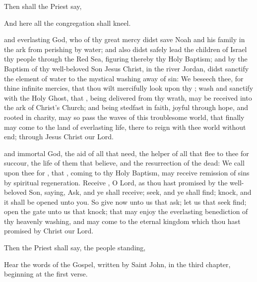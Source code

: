 \newpage

\begin{rubric}
Then shall the Priest say,
\end{rubric}


\begin{rubric}
And here all the congregation shall kneel.
\end{rubric}

 and everlasting God, who of thy great mercy didst save Noah and his family in the ark from perishing by water; and also didst safely lead the children of Israel thy people through the Red Sea, figuring thereby thy Holy Baptism; and by the Baptism of thy well-beloved Son Jesus Christ, in the river Jordan, didst sanctify the element of water to the mystical washing away of sin: We beseech thee, for thine infinite mercies, that thou wilt mercifully look upon  thy ; wash  and sanctify  with the Holy Ghost, that , being delivered from thy wrath, may be received into the ark of Christ's Church; and being stedfast in faith, joyful through hope, and rooted in charity, may so pass the waves of this troublesome world, that finally  may come to the land of everlasting life, there to reign with thee world without end; through Jesus Christ our Lord.

 and immortal God, the aid of all that need, the helper of all that flee to thee for succour, the life of them that believe, and the resurrection of the dead: We call upon thee for , that , coming to thy Holy Baptism, may receive remission of  sins by spiritual regeneration.
Receive , O Lord, as thou hast promised by the well-beloved Son, saying, Ask, and ye shall receive; seek, and ye shall find; knock, and it shall be opened unto you.
So give now unto us that ask; let us that seek find; open the gate unto us that knock; that  may enjoy the everlasting benediction of thy heavenly washing, and may come to the eternal kingdom which thou hast promised by Christ our Lord.

\begin{rubric}
Then the Priest shall say, the people standing,
\end{rubric}

\begin{center}
Hear the words of the Gospel, written by Saint John, in the third chapter, beginning at the first verse.
\end{center}


